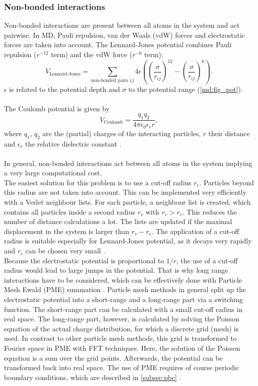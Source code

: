\subsubsection{Non-bonded interactions}
Non-bonded interactions are present between all atoms in the system and act pairwise. In MD, Pauli repulsion, van der Waals (vdW) forces and electrostatic forces are taken into account.
The Lennard-Jones potential combines Pauli repulsion ($r^{-12}$ term) and the vdW force ($r^{-6}$ term):
\begin{equation}
V_\text{Lennard-Jones} = \sum_{\text{non-bonded pairs i,j}} 4 \epsilon\left(\left(\frac{\sigma}{r_{ij}}\right)^{12} - \left(\frac{\sigma}{r_{ij}}\right)^6\right).
\end{equation}
$\epsilon$ is related to the potential depth and $\sigma$ to the potential range (\autoref{md:fig_pot}).\\
\\
The Coulomb potential is given by
\begin{equation}
V_\text{Coulomb} = \frac{q_1 q_2}{4 \pi \epsilon_0 \epsilon_r r},
\end{equation}
where $q_1$, $q_2$ are the (partial) charges of the interacting particles, $r$ their distance and $\epsilon_r$ the relative dielectric constant \autocite[p. 65-71]{gromacsManual}.\\
\\
In general, non-bonded interactions act between all atoms in the system implying a very large computational cost.\\
The easiest solution for this problem is to use a cut-off radius $r_c$. Particles beyond this radius are not taken into account. This can be implemented very efficiently with a Verlet neighbour lists. For each particle, a neighbour list is created, which contains all particles inside a second radius $r_v$ with $r_v > r_c$. This reduces the number of distance calculations a lot. The lists are updated if the maximal displacement in the system is larger than $r_v - r_c$.  The application of a cut-off radius is suitable especially for Lennard-Jones potential, as it decays very rapidly and $r_c$ can be chosen very small \autocite[p. 144]{greenBook}.\\
Because the electrostatic potential is proportional to $1/r$, the use of a cut-off radius would lead to large jumps in the potential. That is why long range interactions have to be considered, which can be effectively done with Particle Mesh Ewald (PME) summation \autocite{pme}. Particle mesh methods in general split up the electrostatic potential into a short-range and a long-range part via a switching function. The short-range part can be calculated with a small cut-off radius in real space. The long-range part, however, is calculated by solving the Poisson equation of the actual charge distribution, for which a discrete grid (mesh) is used. In contrast to other particle mesh methods, this grid is transformed to Fourier space in PME with FFT techniques. Here, the solution of the Poisson equation is a sum over the grid points. Afterwards, the potential can be transformed back into real space. The use of PME requires of course periodic boundary conditions, which are described in \autoref{subsec:pbc} \autocite[p. 246-251]{greenBook}.
